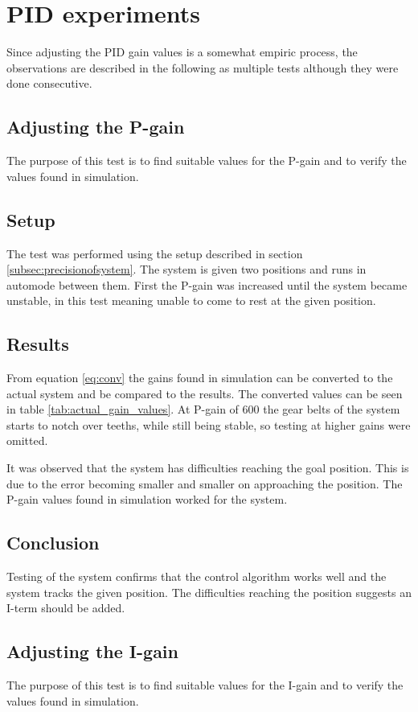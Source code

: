 \chapter{PID experiments}\label{sec:pid_experiments}
Since adjusting the PID gain values is a somewhat empiric process, the
observations are described in the following as multiple tests although they were
done consecutive.

\section{Adjusting the P-gain}\label{sec:pid_experiments_p}
The purpose of this test is to find suitable values for the P-gain and to verify
the values found in simulation.

\section*{Setup} The test was performed using the setup described in
section \ref{subsec:precisionofsystem}. The system is given two positions and runs in
automode between them. First the P-gain was increased until the system became
unstable, in this test meaning unable to come to rest at the given position.

\section*{Results} From equation \ref{eq:conv} the gains found in simulation can be
converted to the actual system and be compared to the results. The converted
values can be seen in table \ref{tab:actual_gain_values}. At P-gain of 600 the gear
belts of the system starts to notch over teeths, while still being stable, so
testing at higher gains were omitted.

It was observed that the system has difficulties reaching
the goal position. This is due to the error becoming smaller and smaller on
approaching the position. The P-gain values found in simulation worked for the
system.

\section*{Conclusion} Testing of the system confirms that the control
algorithm works well and the system tracks the given position. The difficulties
reaching the position suggests an I-term should be added.

\section{Adjusting the I-gain}\label{sec:pid_experiments_i}
The purpose of this test is to find suitable values for the I-gain and to verify
the values found in simulation.

